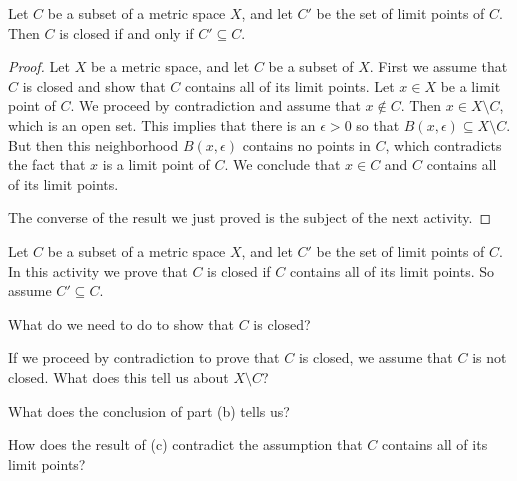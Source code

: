 \begin{theorem} \label{thm:closed_limitpoints} Let $C$ be a subset of a metric space $X$, and let $C'$ be the set of limit points of $C$. Then $C$ is closed if and only if $C' \subseteq C$.  
\end{theorem}

\begin{proof} Let $X$ be a metric space, and let $C$ be a subset of $X$. First we assume that $C$ is closed and show that $C$ contains all of its limit points. Let $x \in X$ be a limit point of $C$. We proceed by contradiction and assume that $x \notin C$. Then $x \in X \setminus C$, which is an open set. This implies that there is an $\epsilon > 0$ so that $B(x, \epsilon) \subseteq X \setminus C$. But then this neighborhood $B(x, \epsilon)$ contains no points in $C$, which contradicts the fact that $x$ is a limit point of $C$. We conclude that $x \in C$ and $C$ contains all of its limit points.

The converse of the result we just proved is the subject of the next activity.

\end{proof}


\begin{activity} Let $C$ be a subset of a metric space $X$, and let $C'$ be the set of limit points of $C$. In this activity we prove that $C$ is closed if $C$ contains all of its limit points. So assume $C' \subseteq C$. 
\ba
\item What do we need to do to show that $C$ is closed? 

\item If we proceed by contradiction to prove that $C$ is closed, we assume that $C$ is not closed. What does this tell us about $X \setminus C$?  

\item What does the conclusion of part (b) tells us?

\item How does the result of (c) contradict the assumption that $C$ contains all of its limit points? 

\ea

\end{activity}

